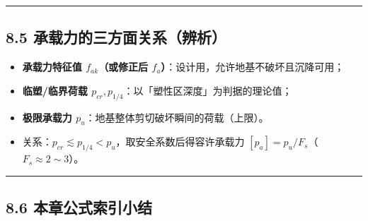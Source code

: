 \documentclass[
]{article}
\providecommand{\tightlist}{%
  \setlength{\itemsep}{0pt}\setlength{\parskip}{0pt}}
\begin{document}
\begin{center}\rule{0.5\linewidth}{0.5pt}\end{center}

\subsection{8.5
承载力的三方面关系（辨析）}\label{ux627fux8f7dux529bux7684ux4e09ux65b9ux9762ux5173ux7cfbux8fa8ux6790}

\begin{itemize}
\tightlist
\item
  \textbf{承载力特征值 \(f_{ak}\)（或修正后
  \(f_a\)）}：设计用，允许地基不破坏且沉降可用；
\item
  \textbf{临塑/临界荷载
  \(p_{cr},p_{1/4}\)}：以「塑性区深度」为判据的理论值；
\item
  \textbf{极限承载力 \(p_u\)}：地基整体剪切破坏瞬间的荷载（上限）。
\item
  关系：\(p_{cr}\lesssim p_{1/4}<p_u\)，取安全系数后得容许承载力
  \([p_a]=p_u/F_s\)（\(F_s\approx2\sim3\)）。
\end{itemize}

\begin{center}\rule{0.5\linewidth}{0.5pt}\end{center}

\subsection{8.6
本章公式索引小结}\label{ux672cux7ae0ux516cux5f0fux7d22ux5f15ux5c0fux7ed3-7}
\end{document}
